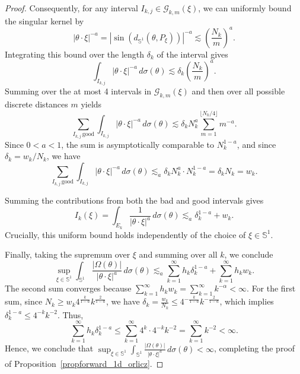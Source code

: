 \documentclass[10pt,a4paper]{amsart}
\begin{document}
\begin{proof}
	Consequently, for any interval $I_{k,j} \in \mathcal{G}_{k,m}(\xi)$, we can uniformly bound the singular kernel by
	$$ |\theta \cdot \xi|^{-a} = |\sin(d_{\mathbb{S}^1}(\theta, P_\xi))|^{-a} \lesssim \left(\frac{N_k}{m}\right)^a.$$
	Integrating this bound over the length $\delta_k$ of the interval gives
	$$ \int_{I_{k,j}} |\theta \cdot \xi|^{-a} \, d\sigma(\theta) \lesssim \delta_k \left(\frac{N_k}{m}\right)^a. $$
	Summing over the at most 4 intervals in $\mathcal{G}_{k,m}(\xi)$ and then over all possible discrete distances $m$ yields
	$$ \sum_{I_{k,j} \, \text{good}} \int_{I_{k,j}} |\theta \cdot \xi|^{-a} \, d\sigma(\theta) \lesssim \delta_k N_k^a \sum_{m=1}^{\lfloor N_k/4 \rfloor} m^{-a}. $$
	Since $0 < a < 1$, the sum is asymptotically comparable to $N_k^{1-a}$, and since $\delta_k = w_k/N_k$, we have
	$$ \sum_{I_{k,j} \, \text{good}} \int_{I_{k,j}} |\theta \cdot \xi|^{-a} \, d\sigma(\theta) \lesssim_a \delta_k N_k^a \cdot N_k^{1-a} = \delta_k N_k = w_k. $$
	
	Summing the contributions from both the bad and good intervals gives
	$$ I_k(\xi) = \int_{E_k} \frac{1}{|\theta \cdot \xi|^a} \, d\sigma(\theta) \lesssim_a \delta_k^{1-a} + w_k. $$
	Crucially, this uniform bound holds independently of the choice of $\xi \in \mathbb{S}^1$.
	
	Finally, taking the supremum over $\xi$ and summing over all $k$, we conclude
	$$ \sup_{\xi \in \mathbb{S}^1} \int_{\mathbb{S}^1} \frac{|\Omega(\theta)|}{|\theta \cdot \xi|^a} \, d\sigma(\theta) \lesssim_a \sum_{k=1}^\infty h_k \delta_k^{1-a} + \sum_{k=1}^\infty h_k w_k. $$
	The second sum converges because $\sum_{k=1}^\infty h_k w_k = \sum_{k=1}^\infty k^{-\alpha} < \infty$. For the first sum, since $N_k \ge w_k 4^{\frac{k}{1-a}} k^{\frac{2}{1-a}}$, we have $\delta_k = \frac{w_k}{N_k} \le 4^{-\frac{k}{1-a}} k^{-\frac{2}{1-a}}$, which implies $\delta_k^{1-a} \le 4^{-k} k^{-2}$. Thus,
	$$ \sum_{k=1}^\infty h_k \delta_k^{1-a} \le \sum_{k=1}^\infty 4^k \cdot 4^{-k} k^{-2} = \sum_{k=1}^\infty k^{-2} < \infty. $$
	Hence, we conclude that $\sup_{\xi \in \mathbb{S}^1} \int_{\mathbb{S}^1} \frac{|\Omega(\theta)|}{|\theta \cdot \xi|^a} \, d\sigma(\theta) < \infty$, completing the proof of Proposition~\ref{propforward_1d_orlicz}.
\end{proof}
\end{document}
